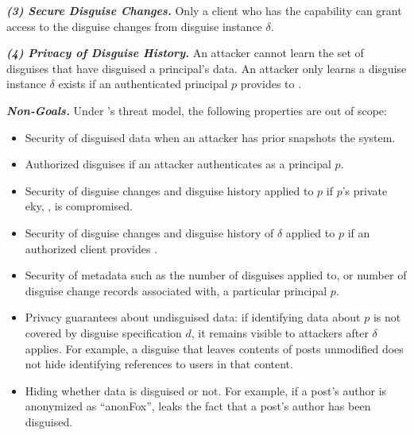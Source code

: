 \vspace{6pt}\noindent\textbf{\emph{(3) Secure Disguise Changes.}}
%
Only a client who has the capability  can grant \sys access to the disguise changes from 
disguise instance $\delta$.
%

\vspace{6pt}\noindent\textbf{\emph{(4) Privacy of Disguise History.}}
%
An attacker cannot learn the set of disguises that have disguised a principal's data.
%
An attacker only learns a disguise instance $\delta$ exists if an authenticated principal $p$ provides
 to \sys.

\vspace{6pt}\noindent\textbf{\emph{Non-Goals.}}
%
Under \sys's threat model, the following properties are out of scope:
%
\begin{itemize}
    \item Security of disguised data when an attacker has prior snapshots the system.
    \item Authorized disguises if an attacker authenticates as a principal $p$. 
    \item Security of disguise changes and disguise history applied to $p$ if $p$'s private eky, , is compromised.
    \item Security of disguise changes and disguise history of $\delta$ applied to $p$ if an
	authorized client provides . 
    \item Security of metadata such as the number of disguises applied to, or number of
	disguise change records associated with, a particular principal $p$.
    \item Privacy guarantees about undisguised data: if identifying data about $p$ is not covered by
        disguise specification $d$, it remains visible to attackers after $\delta$ applies.
        For example, a disguise that leaves contents of posts unmodified does not hide identifying references
	to users in that content.
    \item Hiding whether data is disguised or not. For example, if a post's author is anonymized as ``anonFox'',
        \sys leaks the fact that a post's author has been disguised.
\end{itemize}

